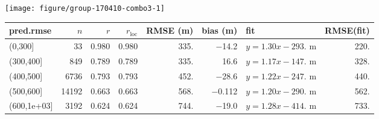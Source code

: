 \documentclass[10pt,notes=all,aspectratio=1610]{beamer}\usepackage[]{graphicx}\usepackage[]{color}
\newenvironment{knitrout}{}{} %
\begin{document}
\begin{frame}[fragile]{\insertsection}
\begin{knitrout}
\color{fgcolor}

{\centering \texttt{[image: figure/group-170410-combo3-1]} 

}



\end{knitrout}
\end{frame}
\begin{frame}[fragile]{\insertsection}
  \begin{adjustbox}{max width=\textwidth}
\begin{tabular}{lrrrrrlr}
  \hline
\hline
pred.rmse & $n$ & $r$ & $r_\text{loc}$ & RMSE (m) & bias (m) & fit & RMSE(fit) \\ 
  \hline
(0,300] &   33 & 0.980 & 0.980 & 335. & $-$14.2 & $y = 1.30 x - 293.$ m & 220. \\ 
  (300,400] &  849 & 0.789 & 0.789 & 335. & 16.6 & $y = 1.17 x - 147.$ m & 328. \\ 
  (400,500] & 6736 & 0.793 & 0.793 & 452. & $-$28.6 & $y = 1.22 x - 247.$ m & 440. \\ 
  (500,600] & 14192 & 0.663 & 0.663 & 568. & $-$0.112 & $y = 1.20 x - 290.$ m & 562. \\ 
  (600,1e+03] & 3192 & 0.624 & 0.624 & 744. & $-$19.0 & $y = 1.28 x - 414.$ m & 733. \\ 
   \hline
\hline
\end{tabular}

  \end{adjustbox}
\end{frame}
\end{document}
